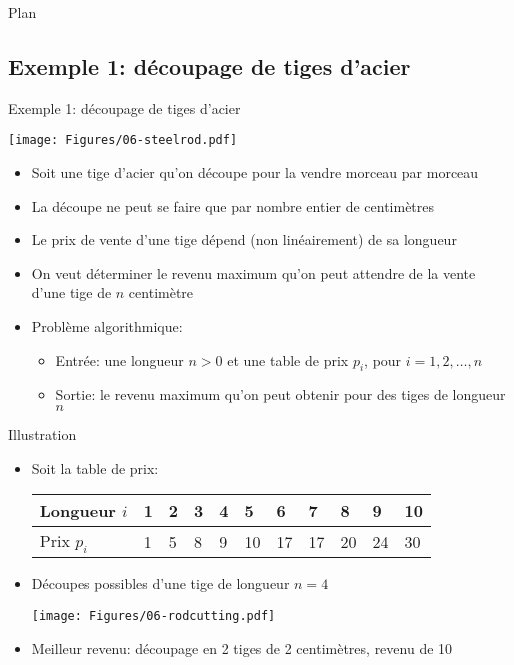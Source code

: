 \begin{frame}{Plan}


\end{frame}

\subsection{Exemple 1: découpage de tiges d'acier}

\begin{frame}{Exemple 1: découpage de tiges d'acier}

\bigskip

\centerline{\texttt{[image: Figures/06-steelrod.pdf]}}

\bigskip

\begin{itemize}
\item Soit une tige d'acier qu'on découpe pour la vendre morceau par morceau
\item La découpe ne peut se faire que par nombre entier de centimètres
\item Le prix de vente d'une tige dépend (non linéairement) de sa longueur
\item On veut déterminer le revenu maximum qu'on peut attendre de la vente d'une tige de $n$ centimètre
\item Problème algorithmique:
\begin{itemize}
\item Entrée: une longueur $n>0$ et une table de prix $p_i$, pour $i=1,2,\ldots,n$
\item Sortie: le revenu maximum qu'on peut obtenir pour des tiges de longueur $n$
\end{itemize}
\end{itemize}
\end{frame}

\begin{frame}{Illustration}
\begin{itemize}
\item Soit la table de prix:
\bigskip

\begin{center}\small
\begin{tabular}{l|llllllllll}
Longueur $i$ & 1 & 2 & 3 & 4 & 5 & 6 & 7 & 8 & 9 & 10\\
\hline
Prix $p_i$ & 1 & 5 & 8 & 9 & 10 & 17 & 17 & 20 & 24 & 30\\
\end{tabular}
\end{center}

\bigskip

\item Découpes possibles d'une tige de longueur $n=4$

\bigskip

\centerline{\texttt{[image: Figures/06-rodcutting.pdf]}}

\bigskip

\item Meilleur revenu: découpage en 2 tiges de 2 centimètres, revenu de 10
\end{itemize}
\end{frame}

